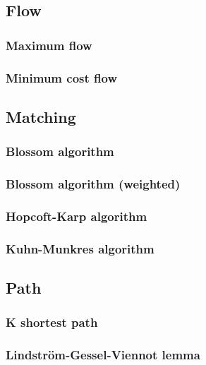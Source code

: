 \documentclass[titlepage,a4paper,10pt]{article}
\begin{document}
\begin{multicols}{2}
\begin{spacing}{0.8}
{			\subsection{Flow}
				\subsubsection{Maximum flow}
					
				\subsubsection{Minimum cost flow}
					
			\subsection{Matching}
				
				\subsubsection{Blossom algorithm}
					
				\subsubsection{Blossom algorithm (weighted)}
					
				\subsubsection{Hopcoft-Karp algorithm}
					
				\subsubsection{Kuhn-Munkres algorithm}
					
			\subsection{Path}
				\subsubsection{K shortest path}
					
				\subsubsection{Lindström-Gessel-Viennot lemma}
					
}
\end{spacing}
\end{multicols}
\end{document}
